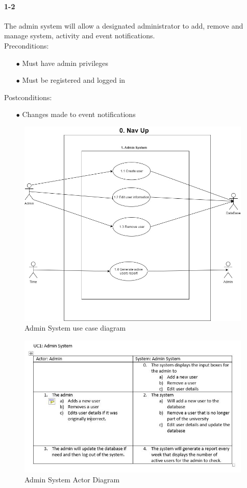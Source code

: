 \documentclass[a4paper,12pt]{article}
\begin{document}
\paragraph{1-2}
The admin system will allow a designated administrator to add, remove and manage system, activity and event notifications.\\
Preconditions:
\begin{itemize}
	\item[$\bullet$] Must have admin privileges
	\item[$\bullet$] Must be registered and logged in
\end{itemize}
Postconditions:
\begin{itemize}
	\item[$\bullet$] Changes made to event notifications
\end{itemize}
\begin{figure}[H]
\includegraphics[width=\textwidth]{UseCaseDiagrams/AdminUCD.JPG}
\caption{Admin System use case diagram}
\label{fig:Admin Use Case Diagram}
\end{figure}
\begin{figure}[H]
\includegraphics[width=\textwidth]{ActorDiagrams/AdminAD.JPG}
\caption{Admin System Actor Diagram}
\label{fig:Admin Actor Diagram}
\end{figure}
\end{document}
